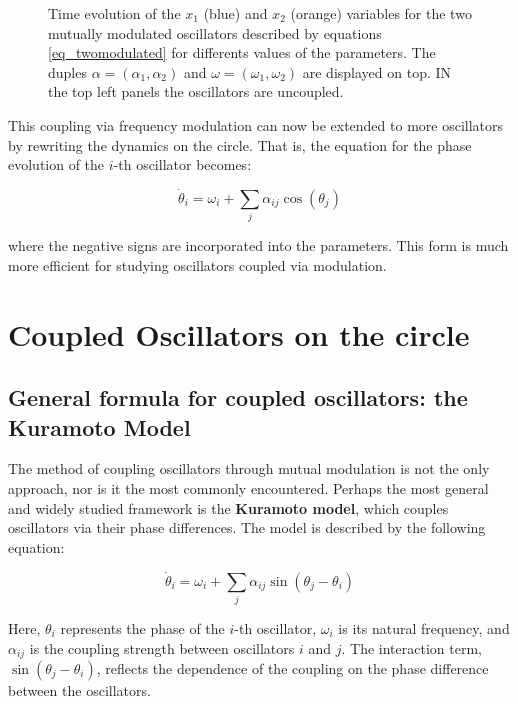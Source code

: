 \documentclass{article}
\begin{document}
\begin{figure} [h]
    \centerline{}
    \caption{Time evolution of the $x_1$ (blue) and $x_2$  (orange) variables for the two mutually modulated oscillators described by equations \ref{eq_twomodulated} for differents values of the parameters. The duples $\alpha=(\alpha_1,\alpha_2)$ and $\omega=(\omega_1,\omega_2)$ are 
    displayed on top. IN the top left panels the oscillators are uncoupled.}
    \label{fig_twomodulated}
\end{figure}

This coupling via frequency modulation can now be extended to more oscillators by rewriting the dynamics on the circle. That is, the equation for the phase evolution of the $i$-th oscillator becomes:

\begin{equation} \label{eq_nmodulated}
    \dot{\theta}_i = \omega_i + \sum_j \alpha_{ij} \cos({\theta_j})
\end{equation}

where the negative signs are incorporated into the parameters. This form is much more efficient for studying oscillators coupled via modulation.



\section{Coupled Oscillators on the circle}

\subsection{General formula for coupled oscillators: the Kuramoto Model}

The method of coupling oscillators through mutual modulation is not the only approach, nor is it the most commonly encountered. Perhaps the most general and widely studied framework is the {\bf Kuramoto model}, which couples oscillators via their phase differences. The model is described by the following equation:


\begin{equation} \label{eq_kuramoto}
    \dot{\theta}_i = \omega_i + \sum_j \alpha_{ij} \sin({\theta_j}-{\theta_i})
\end{equation}

Here, $\theta_i$ represents the phase of the $i$-th oscillator, $\omega_i$ is its natural frequency, and $\alpha_{ij}$ is the coupling strength between oscillators $i$ and $j$. The interaction term, $\sin(\theta_j - \theta_i)$, reflects the dependence of the coupling on the phase difference between the oscillators.
\end{document}
